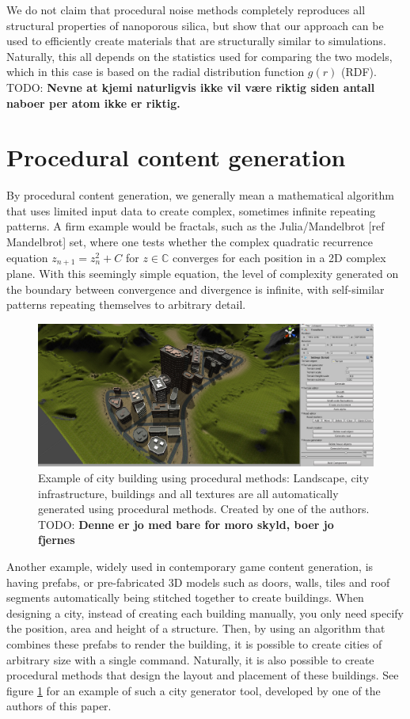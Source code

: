 \documentclass[aps,pre,twocolumn,letterpaper,floatfix,showpacs]{revtex4}
\newcommand{\todo}[1]{ {\color{Magenta} TODO: \color{Blue} \textbf{#1} }}
\begin{document}
We do not claim that procedural noise methods completely reproduces all structural properties of nanoporous silica, but show that our approach can be used to efficiently create materials that are structurally similar to simulations. Naturally, this all depends on the statistics used for comparing the two models, which in this case is based on the radial distribution function $g(r)$ (RDF). 
\todo{Nevne at kjemi naturligvis ikke vil være riktig siden antall naboer per atom ikke er riktig. }
\section{Procedural content generation}
By procedural content generation, we generally mean a mathematical algorithm that uses limited input data to create complex, sometimes infinite repeating patterns. A firm example would be fractals, such as the Julia/Mandelbrot [ref Mandelbrot] set, where one tests whether the complex quadratic recurrence equation $z_{n+1} = z_n^2 +C$ for $z \in \mathbb C$ converges for each position in a 2D complex plane. With this seemingly simple equation, the level of complexity generated on the boundary between convergence and divergence is infinite, with self-similar patterns repeating themselves to arbitrary detail.
\begin{figure}
\includegraphics[width=.5\textwidth]{orphancity.png}
\caption{Example of city building using procedural methods: Landscape, city infrastructure, buildings and all textures are all automatically generated using procedural methods. Created by one of the authors. \todo{Denne er jo med bare for moro skyld, boer jo fjernes} }
\label{fig:orphancity}
\end{figure}

Another example, widely used in contemporary game content generation, is having prefabs, or pre-fabricated 3D models such as doors, walls, tiles and roof segments automatically being stitched together to create buildings. When designing a city, instead of creating each building manually, you only need specify the position, area and height of a structure. Then, by using an algorithm that combines these prefabs to render the building, it is possible to create cities of arbitrary size with a single command. Naturally, it is also possible to create procedural methods that design the layout and placement of these buildings. See figure \ref{fig:orphancity} for an example of such a city generator tool, developed by one of the authors of this paper. 
\end{document}
